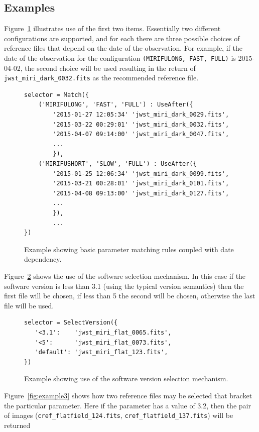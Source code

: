 \documentclass[final,authoryear,5p,times,twocolumn]{elsarticle}
\begin{document}
\subsection{Examples}

Figure~\ref{fig:example1} illustrates use of the first two items. Essentially two different configurations are supported, and for each there are three possible choices of reference files that depend on the date of the observation. For example, if the date of the observation for the configuration {\tt (\textquotesingle MIRIFULONG\textquotesingle , \textquotesingle FAST\textquotesingle , \textquotesingle FULL\textquotesingle )} is 2015-04-02, the second choice will be used resulting in the return of {\tt jwst\_miri\_dark\_0032.fits} as the recommended reference file.

\begin{figure}
\begin{verbatim}
selector = Match({
    ('MIRIFULONG', 'FAST', 'FULL') : UseAfter({
        '2015-01-27 12:05:34' 'jwst_miri_dark_0029.fits',
        '2015-03-22 00:29:01' 'jwst_miri_dark_0032.fits',
        '2015-04-07 09:14:00' 'jwst_miri_dark_0047.fits',
        ...
        }),
    ('MIRIFUSHORT', 'SLOW', 'FULL') : UseAfter({
        '2015-01-25 12:06:34' 'jwst_miri_dark_0099.fits',
        '2015-03-21 00:28:01' 'jwst_miri_dark_0101.fits',
        '2015-04-08 09:13:00' 'jwst_miri_dark_0127.fits',
        ...
        }),
        ...
})
\end{verbatim}
\caption{Example showing basic parameter matching rules coupled with date dependency.}
\label{fig:example1}
\end{figure}

Figure~\ref{fig:example2} shows the use of the software selection mechanism. In this case if the software version is less than 3.1 (using the typical version semantics) then the first file will be chosen, if less than 5 the second will be chosen, otherwise the last file will be used.

\begin{figure}
\begin{verbatim}
selector = SelectVersion({
   '<3.1':    'jwst_miri_flat_0065.fits',
   '<5':      'jwst_miri_flat_0073.fits',
   'default': 'jwst_miri_flat_123.fits',
})
\end{verbatim}
\caption{Example showing use of the software version selection mechanism.}
\label{fig:example2}
\end{figure}

Figure~\ref{fig:example3} shows how two reference files may be selected
that bracket the particular parameter. Here if the parameter has a value 
of 3.2, then the pair of images 
(\texttt{cref\_flatfield\_124.fits}, \texttt{cref\_flatfield\_137.fits}) will be returned
\end{document}
